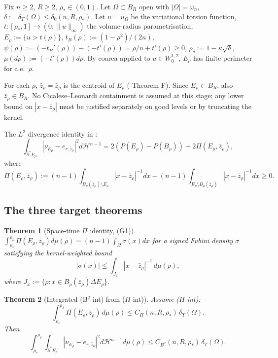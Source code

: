 \documentclass[11pt]{article}
\newtheorem{theorem}{Theorem}[section]
\theoremstyle{definition}
\newcommand{\Om}{\Omega}
\newcommand{\rstar}{\rho_{*}}
\newcommand{\zbar}{\bar z_{\rho}}
\newcommand{\er}{e_{r,\zbar}}
\newcommand{\PiE}{\Pi(E_{\rho},\zbar)}
\begin{document}
Fix $n\ge 2$, $R\ge 2$, $\rstar\in(0,1)$. Let $\Om\subset B_R$ open
with $|\Om|=\omega_n$, $\delta:=\delta_T(\Om)\le\delta_0(n,R,\rstar)$.
Let $u=u_\Om$ be the variational torsion function,
$t:[\rstar,1]\to(0,\|u\|_\infty)$ the volume-radius parametrisation,
$E_\rho:=\{u>t(\rho)\}$, $t_B(\rho):=(1-\rho^2)/(2n)$,
$\psi(\rho):=(-t_B'(\rho))-(-t'(\rho))=\rho/n+t'(\rho)\ge 0$,
$\rho_\delta:=1-\kappa\sqrt\delta$,
$\mu(d\rho):=(-t'(\rho))d\rho$.
By coarea applied to $u\in W^{1,2}_0$, $E_\rho$ has finite
perimeter for a.e.\ $\rho$.

For each $\rho$, $\zbar=\bar z_\rho$ is the centroid of $E_\rho$
(\cite{CentroidBound} Theorem F). Since $E_\rho\subset B_R$, also
$\zbar\in B_R$.  No Cicalese--Leonardi containment is assumed at this
stage; any lower bound on $|x-\zbar|$ must be justified separately on
good levels or by truncating the kernel.

The $L^2$ divergence identity in \cite{LevelSetIdentity}:
\begin{equation}\label{eq:53prime}
   \int_{\partial^*E_\rho}|\nu_{E_\rho}-\er|^2 d\mathcal H^{n-1}
   = 2(P(E_\rho)-P(B_\rho))+2\PiE,
\end{equation}
where
\begin{equation}\label{eq:Pi}
   \PiE := (n-1)\int_{B_\rho(\zbar)\setminus E_\rho}|x-\zbar|^{-1}dx
         - (n-1)\int_{E_\rho\setminus B_\rho(\zbar)}|x-\zbar|^{-1}dx \ge 0.
\end{equation}

\subsection{The three target theorems}

\begin{theorem}[Space-time $\Pi$ identity, (G1)]\label{thm:G1}
$\int_{\rstar}^{\rho_\delta}\PiE d\mu(\rho)=(n-1)\int_{\widetilde\Om}\sigma(x)dx$
for a signed Fubini density $\sigma$ satisfying the kernel-weighted bound
\[
   |\sigma(x)|\le \int_{J_x}|x-\bar z_\rho|^{-1}\,d\mu(\rho),
\]
where
$J_x:=\{\rho:x\in B_\rho(\zbar)\Delta E_\rho\}$.
\end{theorem}

\begin{theorem}[Integrated (B$^2$-int) from \textup{($\Pi$-int)}]\label{thm:G3}
Assume \textup{($\Pi$-int)}:
\[
   \int_{\rstar}^{\rho_\delta}\PiE\,d\mu(\rho)
   \le C_\Pi(n,R,\rstar)\,\delta_T(\Om).
\]
Then
\[
   \int_{\rstar}^{\rho_\delta}\int_{\partial^*E_\rho}|\nu_{E_\rho}-\er|^2 d\mathcal H^{n-1} d\mu(\rho)
   \le C_{B^2}(n,R,\rstar)\,\delta_T(\Om).
\]
\end{theorem}
\end{document}
